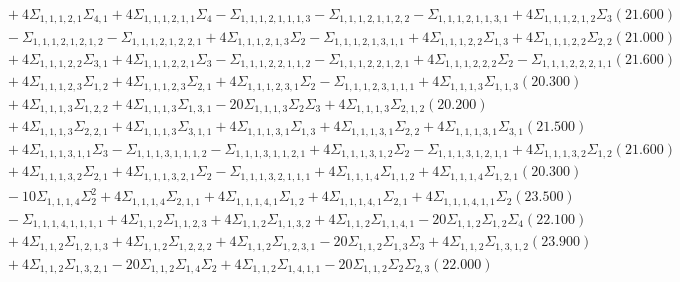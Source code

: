 \documentclass[12pt]{article}
\begin{document}
\begin{landscape}
\begin{align*}
		&\quad\quad +4\Sigma_{1,1,1,2,1}\Sigma_{4,1}+4\Sigma_{1,1,1,2,1,1}\Sigma_{4}-\Sigma_{1,1,1,2,1,1,1,3}-\Sigma_{1,1,1,2,1,1,2,2}-\Sigma_{1,1,1,2,1,1,3,1}+4\Sigma_{1,1,1,2,1,2}\Sigma_{3}(21.600) \\ 
		&\quad\quad -\Sigma_{1,1,1,2,1,2,1,2}-\Sigma_{1,1,1,2,1,2,2,1}+4\Sigma_{1,1,1,2,1,3}\Sigma_{2}-\Sigma_{1,1,1,2,1,3,1,1}+4\Sigma_{1,1,1,2,2}\Sigma_{1,3}+4\Sigma_{1,1,1,2,2}\Sigma_{2,2}(21.000) \\ 
		&\quad\quad +4\Sigma_{1,1,1,2,2}\Sigma_{3,1}+4\Sigma_{1,1,1,2,2,1}\Sigma_{3}-\Sigma_{1,1,1,2,2,1,1,2}-\Sigma_{1,1,1,2,2,1,2,1}+4\Sigma_{1,1,1,2,2,2}\Sigma_{2}-\Sigma_{1,1,1,2,2,2,1,1}(21.600) \\ 
		&\quad\quad +4\Sigma_{1,1,1,2,3}\Sigma_{1,2}+4\Sigma_{1,1,1,2,3}\Sigma_{2,1}+4\Sigma_{1,1,1,2,3,1}\Sigma_{2}-\Sigma_{1,1,1,2,3,1,1,1}+4\Sigma_{1,1,1,3}\Sigma_{1,1,3}(20.300) \\ 
		&\quad\quad +4\Sigma_{1,1,1,3}\Sigma_{1,2,2}+4\Sigma_{1,1,1,3}\Sigma_{1,3,1}-20\Sigma_{1,1,1,3}\Sigma_{2}\Sigma_{3}+4\Sigma_{1,1,1,3}\Sigma_{2,1,2}(20.200) \\ 
		&\quad\quad +4\Sigma_{1,1,1,3}\Sigma_{2,2,1}+4\Sigma_{1,1,1,3}\Sigma_{3,1,1}+4\Sigma_{1,1,1,3,1}\Sigma_{1,3}+4\Sigma_{1,1,1,3,1}\Sigma_{2,2}+4\Sigma_{1,1,1,3,1}\Sigma_{3,1}(21.500) \\ 
		&\quad\quad +4\Sigma_{1,1,1,3,1,1}\Sigma_{3}-\Sigma_{1,1,1,3,1,1,1,2}-\Sigma_{1,1,1,3,1,1,2,1}+4\Sigma_{1,1,1,3,1,2}\Sigma_{2}-\Sigma_{1,1,1,3,1,2,1,1}+4\Sigma_{1,1,1,3,2}\Sigma_{1,2}(21.600) \\ 
		&\quad\quad +4\Sigma_{1,1,1,3,2}\Sigma_{2,1}+4\Sigma_{1,1,1,3,2,1}\Sigma_{2}-\Sigma_{1,1,1,3,2,1,1,1}+4\Sigma_{1,1,1,4}\Sigma_{1,1,2}+4\Sigma_{1,1,1,4}\Sigma_{1,2,1}(20.300) \\ 
		&\quad\quad -10\Sigma_{1,1,1,4}\Sigma_{2}^{2}+4\Sigma_{1,1,1,4}\Sigma_{2,1,1}+4\Sigma_{1,1,1,4,1}\Sigma_{1,2}+4\Sigma_{1,1,1,4,1}\Sigma_{2,1}+4\Sigma_{1,1,1,4,1,1}\Sigma_{2}(23.500) \\ 
		&\quad\quad -\Sigma_{1,1,1,4,1,1,1,1}+4\Sigma_{1,1,2}\Sigma_{1,1,2,3}+4\Sigma_{1,1,2}\Sigma_{1,1,3,2}+4\Sigma_{1,1,2}\Sigma_{1,1,4,1}-20\Sigma_{1,1,2}\Sigma_{1,2}\Sigma_{4}(22.100) \\ 
		&\quad\quad +4\Sigma_{1,1,2}\Sigma_{1,2,1,3}+4\Sigma_{1,1,2}\Sigma_{1,2,2,2}+4\Sigma_{1,1,2}\Sigma_{1,2,3,1}-20\Sigma_{1,1,2}\Sigma_{1,3}\Sigma_{3}+4\Sigma_{1,1,2}\Sigma_{1,3,1,2}(23.900) \\ 
		&\quad\quad +4\Sigma_{1,1,2}\Sigma_{1,3,2,1}-20\Sigma_{1,1,2}\Sigma_{1,4}\Sigma_{2}+4\Sigma_{1,1,2}\Sigma_{1,4,1,1}-20\Sigma_{1,1,2}\Sigma_{2}\Sigma_{2,3}(22.000) \\ 

\end{align*}
\end{landscape}
\end{document}

